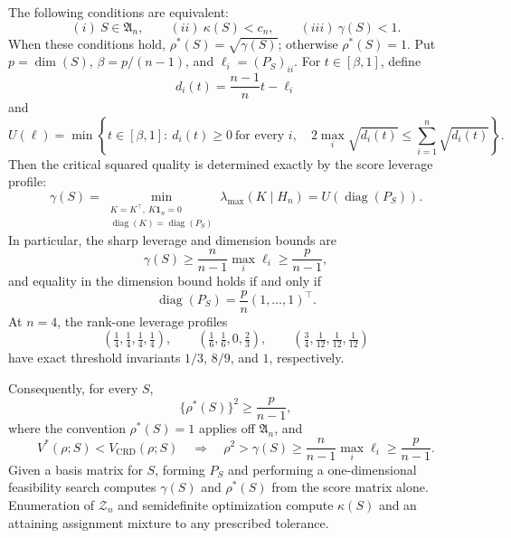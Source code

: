 The following conditions are equivalent:
\[
(i)\ S\in\mathfrak A_n,
\qquad
(ii)\ \kappa(S)<c_n,
\qquad
(iii)\ \gamma(S)<1.
\]
When these conditions hold, \(\rho^*(S)=\sqrt{\gamma(S)}\); otherwise \(\rho^*(S)=1\).  Put \(p=\dim(S)\), \(\beta=p/(n-1)\), and \(\ell_i=(P_S)_{ii}\).  For \(t\in[\beta,1]\), define
\[
d_i(t)=\frac{n-1}{n}t-\ell_i
\]
and
\[
U(\ell)=\min\left\{
t\in[\beta,1]:\ d_i(t)\geq0\ \text{for every }i,\quad
2\max_i\sqrt{d_i(t)}\leq\sum_{i=1}^n\sqrt{d_i(t)}
\right\}.
\]
Then the critical squared quality is determined exactly by the score leverage profile:
\[
\gamma(S)
=\min_{\substack{K=K^\top,\ K\mathbf1_n=0\\
\operatorname{diag}(K)=\operatorname{diag}(P_S)}}
\lambda_{\max}(K\mid H_n)
=U\!\left(\operatorname{diag}(P_S)\right).
\]
In particular, the sharp leverage and dimension bounds are
\[
\gamma(S)\geq\frac{n}{n-1}\max_i\ell_i
\geq\frac{p}{n-1},
\]
and equality in the dimension bound holds if and only if
\[
\operatorname{diag}(P_S)=\frac{p}{n}(1,\ldots,1)^\top.
\]
At \(n=4\), the rank-one leverage profiles
\[
\left(\tfrac14,\tfrac14,\tfrac14,\tfrac14\right),\qquad
\left(\tfrac16,\tfrac16,0,\tfrac23\right),\qquad
\left(\tfrac34,\tfrac1{12},\tfrac1{12},\tfrac1{12}\right)
\]
have exact threshold invariants \(1/3\), \(8/9\), and \(1\), respectively.

Consequently, for every \(S\),
\[
\{\rho^*(S)\}^2\geq\frac{p}{n-1},
\]
where the convention \(\rho^*(S)=1\) applies off \(\mathfrak A_n\), and
\[
V^*(\rho;S)<V_{\mathrm{CRD}}(\rho;S)
\quad\Longrightarrow\quad
\rho^2>\gamma(S)\geq\frac{n}{n-1}\max_i\ell_i
\geq\frac{p}{n-1}.
\]
Given a basis matrix for \(S\), forming \(P_S\) and performing a one-dimensional feasibility search computes \(\gamma(S)\) and \(\rho^*(S)\) from the score matrix alone.  Enumeration of \(\mathcal Z_n\) and semidefinite optimization compute \(\kappa(S)\) and an attaining assignment mixture to any prescribed tolerance.